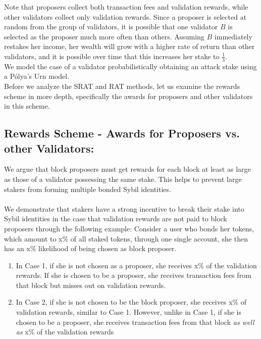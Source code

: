 \documentclass{article}
\renewcommand{\|}{\;|\;}
\begin{document}
Note that proposers collect both transaction fees and validation rewards, while other validators collect only validation rewards. Since a proposer is selected at random from the group of validators, it is possible that one validator $B$ is selected as the proposer much more often than others. Assuming $B$ immediately restakes her income, her wealth will grow with a higher rate of return than other validators, and it is possible over time that this increases her stake to $\frac{1}{3}$. \\

We model the case of a validator probabilistically obtaining an attack stake using a P\'olya's Urn model. \\

Before we analyze the SRAT and RAT methods, let us examine the rewards scheme in more depth, specifically the awards for proposers and other validators in this scheme. 


\subsection{Rewards Scheme - Awards for Proposers vs. other Validators:}

We argue that block proposers must get rewards for each block at least as large as those of a validator possessing the same stake. This helps to prevent large stakers from forming multiple bonded Sybil identities.\\ \\
We demonstrate that stakers have a strong incentive to break their stake into Sybil identities in the case that validation rewards are not paid to block proposers through the following example:\newline \newline
Consider a user who bonds her tokens, which amount to x\% of all staked tokens, through one single account, she then has an x\% likelihood of being chosen as block proposer.
\begin{enumerate}
  \item In Case 1, if she is not chosen as a proposer, she receives x\% of the validation rewards. If she is chosen to be a proposer, she receives transaction fees from that block but misses out on validation rewards.
  \item In Case 2, if she is not chosen to be the block proposer, she receives x\% of validation rewards, similar to Case 1. However, unlike in Case 1, if she is chosen to be a proposer, she receives transaction fees from that block \textit{as well as} x\% of the validation rewards
\end{enumerate}\newline \newline
\end{document}
